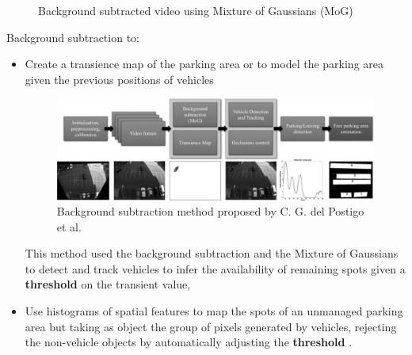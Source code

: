 \documentclass{beamer}
\begin{document}
\begin{frame}[allowframebreaks]
\begin{figure}[!htbp]
\begin{minipage}[b]{0.48\textwidth}
		\caption{Background subtracted video using   Mixture of Gaussians (MoG)}
		\label{bgsub}
	\end{minipage}
\end{figure}
\vspace{5cm}
Background subtraction to:
\begin{itemize}
	\item Create a transience map of the parking area or to model the parking area given the previous positions of vehicles \cite{Postigo}
	\begin{figure}
		\includegraphics[width=300pt]{Pictures/transmap}
		\caption{Background subtraction method proposed by C. G. del Postigo et al.\cite{Postigo}}
		\label{postigo}
	\end{figure}
	This method used the background subtraction and the Mixture of Gaussians to detect and track vehicles to infer the availability of remaining spots given a \textbf{threshold} on the transient value, 
	\item Use histograms of spatial features to map the spots of an unmanaged parking area but taking as object the group of pixels generated by vehicles, rejecting the non-vehicle objects by automatically adjusting the \textbf{threshold} \cite{Choeychuen}.
\end{itemize}


\end{frame}
\end{document}

